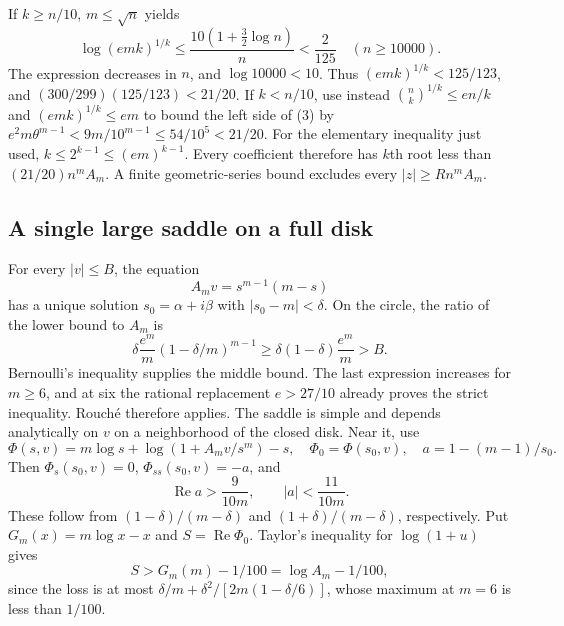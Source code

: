 \documentclass[11pt]{article}
\begin{document}
If $k\ge n/10$, $m\le\sqrt n$ yields
\[
 \log (emk)^{1/k}\le\frac{10(1+\tfrac32\log n)}n
 <\frac2{125}\quad(n\ge10000).
\]
The expression decreases in $n$, and $\log10000<10$.
Thus $(emk)^{1/k}<125/123$, and
$(300/299)(125/123)<21/20$.
If $k<n/10$, use instead $\binom nk^{1/k}\le en/k$ and
$(emk)^{1/k}\le em$ to bound the left side of (3) by
$e^2m\theta^{m-1}<9m/10^{m-1}\le54/10^5<21/20$.
For the elementary inequality just used, $k\le2^{k-1}\le(em)^{k-1}$.
Every coefficient therefore has $k$th root less than
$(21/20)n^mA_m$. A finite geometric-series bound excludes every
$|z|\ge Rn^mA_m$.

\subsection{A single large saddle on a full disk}
For every $|v|\le B$, the equation
\[
                 A_mv=s^{m-1}(m-s)                    \tag{4}
\]
has a unique solution $s_0=\alpha+i\beta$ with $|s_0-m|<\delta$.
On the circle, the ratio of the lower bound to $A_m$ is
\[
 \delta\frac{e^m}m(1-\delta/m)^{m-1}
 \ge\delta(1-\delta)\frac{e^m}m>B.
\]
Bernoulli's inequality supplies the middle bound. The last expression
increases for $m\ge6$, and at six the rational replacement $e>27/10$
already proves the strict inequality. Rouch\'e therefore applies.
The saddle is simple and depends analytically on $v$ on a neighborhood
of the closed disk. Near it, use
\[
 \Phi(s,v)=m\log s+\log(1+A_mv/s^m)-s,\quad
 \Phi_0=\Phi(s_0,v),\quad a=1-(m-1)/s_0.
\]
Then $\Phi_s(s_0,v)=0$, $\Phi_{ss}(s_0,v)=-a$, and
\[
 \operatorname{Re}a>\frac9{10m},\qquad |a|<\frac{11}{10m}. \tag{5}
\]
These follow from $(1-\delta)/(m-\delta)$ and
$(1+\delta)/(m-\delta)$, respectively.
Put $G_m(x)=m\log x-x$ and $S=\operatorname{Re}\Phi_0$.
Taylor's inequality for $\log(1+u)$ gives
\[
 S>G_m(m)-1/100=\log A_m-1/100,                        \tag{6}
\]
since the loss is at most
$\delta/m+\delta^2/[2m(1-\delta/6)]$, whose maximum at $m=6$ is
less than $1/100$.
\end{document}
